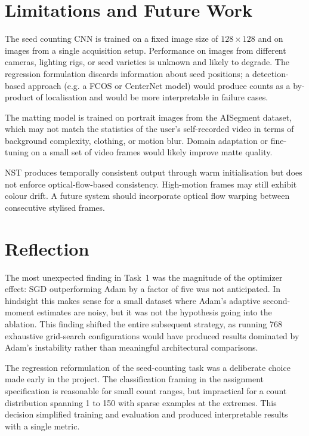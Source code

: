 \documentclass[11pt,a4paper]{article}
\begin{document}
\section{Limitations and Future Work}

The seed counting CNN is trained on a fixed image size of $128\times128$ and on images
from a single acquisition setup. Performance on images from different cameras, lighting
rigs, or seed varieties is unknown and likely to degrade. The regression formulation
discards information about seed positions; a detection-based approach (e.g. a FCOS or
CenterNet model) would produce counts as a by-product of localisation and would be more
interpretable in failure cases.

The matting model is trained on portrait images from the AISegment dataset, which may
not match the statistics of the user's self-recorded video in terms of background
complexity, clothing, or motion blur. Domain adaptation or fine-tuning on a small set of
video frames would likely improve matte quality.

NST produces temporally consistent output through warm initialisation but does not
enforce optical-flow-based consistency. High-motion frames may still exhibit colour drift.
A future system should incorporate optical flow warping between consecutive stylised frames.

\section{Reflection}

The most unexpected finding in Task~1 was the magnitude of the optimizer effect: SGD
outperforming Adam by a factor of five was not anticipated. In hindsight this makes sense
for a small dataset where Adam's adaptive second-moment estimates are noisy, but it was
not the hypothesis going into the ablation. This finding shifted the entire subsequent
strategy, as running 768 exhaustive grid-search configurations would have produced results
dominated by Adam's instability rather than meaningful architectural comparisons.

The regression reformulation of the seed-counting task was a deliberate choice made early
in the project. The classification framing in the assignment specification is reasonable
for small count ranges, but impractical for a count distribution spanning 1 to 150 with
sparse examples at the extremes. This decision simplified training and evaluation and
produced interpretable results with a single metric.
\end{document}
